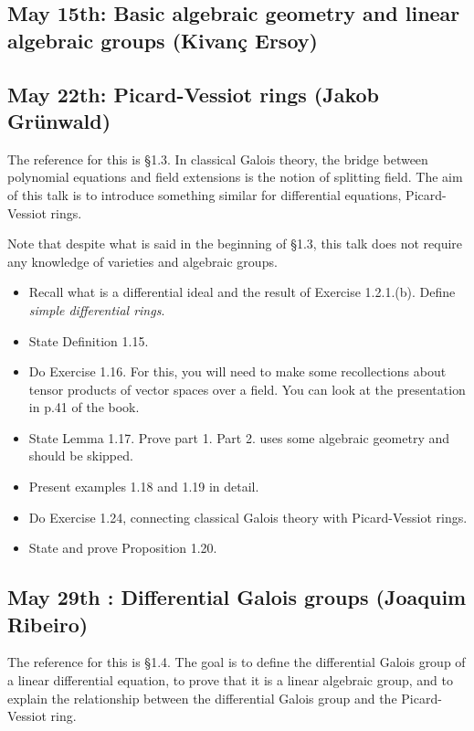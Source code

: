 \documentclass{amsart}
\theoremstyle{definition}
\theoremstyle{remark}
\begin{document}
\subsection{May 15th: Basic algebraic geometry and linear algebraic groups (Kivan\c{c} Ersoy)}


\subsection{May 22th: Picard-Vessiot rings (Jakob Gr\"unwald)}

The reference for this is \S 1.3. In classical Galois theory, the bridge between polynomial equations and field extensions is the notion of splitting field. The aim of this talk is to introduce something similar for differential equations, Picard-Vessiot rings.

Note that despite what is said in the beginning of \S 1.3, this talk does not require any knowledge of varieties and algebraic groups.

\begin{itemize}
\item Recall what is a differential ideal and the result of Exercise 1.2.1.(b). Define \emph{simple differential rings}.
\item State Definition 1.15.
\item Do Exercise 1.16. For this, you will need to make some recollections about tensor products of vector spaces over a field. You can look at the presentation in p.41 of the book.
\item State Lemma 1.17. Prove part 1. Part 2. uses some algebraic geometry and should be skipped.
\item Present examples 1.18 and 1.19 in detail.
\item Do Exercise 1.24, connecting classical Galois theory with Picard-Vessiot rings.
\item State and prove Proposition 1.20.
\end{itemize}


\subsection{May 29th : Differential Galois groups (Joaquim Ribeiro)}

The reference for this is \S 1.4. The goal is to define the differential Galois group of a linear differential equation, to prove that it is a linear algebraic group, and to explain the relationship between the differential Galois group and the Picard-Vessiot ring.
\end{document}
